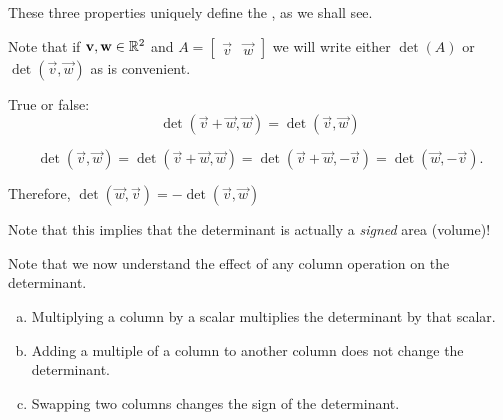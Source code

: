 \begin{applicationActivities}{1}{25}
\begin{definition}
These three properties uniquely define the , as we shall see.
\end{definition}

\begin{observation}
Note that if $\mathbf{v},\mathbf{w} \in \mathbb{R}^2$ and $A=\begin{bmatrix} \vec{v} & \vec{w}\end{bmatrix}$ we will write either $\det(A)$ or $\det(\vec{v},\vec{w})$ as is convenient.
\end{observation}

\begin{activity}{5}
True or false: $$\det(\vec{v}+\vec{w},\vec{w}) = \det(\vec{v},\vec{w})$$

\begin{center}
\end{center}
\end{activity}

\begin{observation}
$$\det(\vec{v},\vec{w}) =  \det(\vec{v}+\vec{w}, \vec{w}) = \det(\vec{v}+\vec{w}, -\vec{v}) = \det(\vec{w}, -\vec{v}).$$ 

Therefore, $\det(\vec{w},\vec{v}) = -\det(\vec{v},\vec{w})$ 


Note that this implies that the determinant is actually a \textit{signed} area (volume)!
\end{observation}



\begin{observation}
  Note that we now understand the effect of any column operation on the determinant.
  \begin{enumerate}[(a)]
  \item Multiplying a column by a scalar multiplies the determinant by that scalar.
  \item Adding a multiple of a column to another column does not change the determinant.
  \item Swapping two columns changes the sign of the determinant.
  \end{enumerate}
\end{observation}


\end{applicationActivities}
